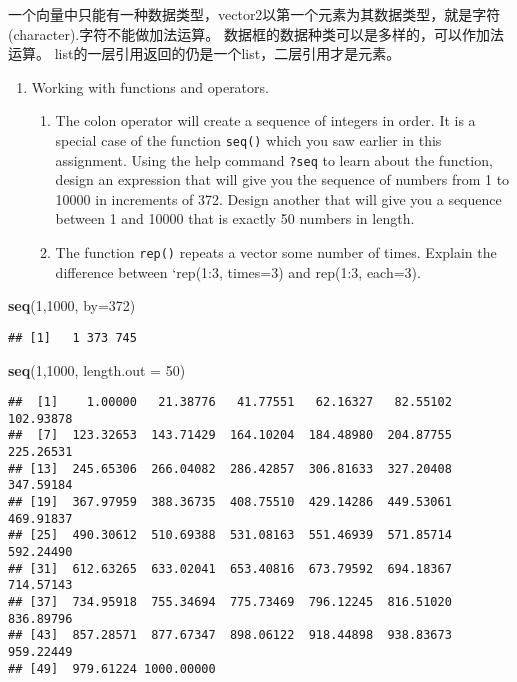 \documentclass[hyperref,]{ctexart}
\newenvironment{Shaded}{\begin{snugshade}}{\end{snugshade}}
\newcommand{\DataTypeTok}[1]{\textcolor[rgb]{0.13,0.29,0.53}{#1}}
\newcommand{\DecValTok}[1]{\textcolor[rgb]{0.00,0.00,0.81}{#1}}
\newcommand{\KeywordTok}[1]{\textcolor[rgb]{0.13,0.29,0.53}{\textbf{#1}}}
\newcommand{\NormalTok}[1]{#1}
\providecommand{\tightlist}{%
  \setlength{\itemsep}{0pt}\setlength{\parskip}{0pt}}
\begin{document}
一个向量中只能有一种数据类型，vector2以第一个元素为其数据类型，就是字符(character).字符不能做加法运算。
数据框的数据种类可以是多样的，可以作加法运算。
list的一层引用返回的仍是一个list，二层引用才是元素。

\begin{enumerate}
\def\labelenumi{\arabic{enumi}.}
\setcounter{enumi}{2}
\tightlist
\item
  Working with functions and operators.

  \begin{enumerate}
  \def\labelenumii{\alph{enumii}.}
  \tightlist
  \item
    The colon operator will create a sequence of integers in order. It
    is a special case of the function \texttt{seq()} which you saw
    earlier in this assignment. Using the help command \texttt{?seq} to
    learn about the function, design an expression that will give you
    the sequence of numbers from 1 to 10000 in increments of 372. Design
    another that will give you a sequence between 1 and 10000 that is
    exactly 50 numbers in length.
  \item
    The function \texttt{rep()} repeats a vector some number of times.
    Explain the difference between `rep(1:3, times=3) and rep(1:3,
    each=3).
  \end{enumerate}
\end{enumerate}

\begin{Shaded}
\begin{Highlighting}[]
\KeywordTok{seq}\NormalTok{(}\DecValTok{1}\NormalTok{,}\DecValTok{1000}\NormalTok{, }\DataTypeTok{by=}\DecValTok{372}\NormalTok{)}
\end{Highlighting}
\end{Shaded}

\begin{verbatim}
## [1]   1 373 745
\end{verbatim}

\begin{Shaded}
\begin{Highlighting}[]
\KeywordTok{seq}\NormalTok{(}\DecValTok{1}\NormalTok{,}\DecValTok{1000}\NormalTok{, }\DataTypeTok{length.out =} \DecValTok{50}\NormalTok{)}
\end{Highlighting}
\end{Shaded}

\begin{verbatim}
##  [1]    1.00000   21.38776   41.77551   62.16327   82.55102  102.93878
##  [7]  123.32653  143.71429  164.10204  184.48980  204.87755  225.26531
## [13]  245.65306  266.04082  286.42857  306.81633  327.20408  347.59184
## [19]  367.97959  388.36735  408.75510  429.14286  449.53061  469.91837
## [25]  490.30612  510.69388  531.08163  551.46939  571.85714  592.24490
## [31]  612.63265  633.02041  653.40816  673.79592  694.18367  714.57143
## [37]  734.95918  755.34694  775.73469  796.12245  816.51020  836.89796
## [43]  857.28571  877.67347  898.06122  918.44898  938.83673  959.22449
## [49]  979.61224 1000.00000
\end{verbatim}
\end{document}

